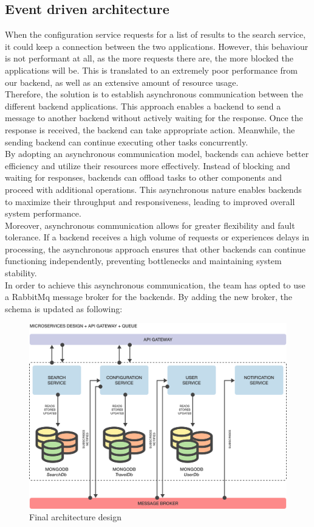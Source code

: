 \documentclass[./chapters/design.tex]{subfiles}
\begin{document}
\subsection{Event driven architecture}
When the configuration service requests for a list of results to the search
service, it could keep a connection between the two applications. However, this
behaviour is not performant at all, as the more requests there are, the more
blocked the applications will be. This is translated to an extremely poor
performance from our backend, as well as an extensive amount of resource usage.
\\
Therefore, the solution is to establish asynchronous communication between the
different backend applications. This approach enables a backend to send a
message to another backend without actively waiting for the response. Once the
response is received, the backend can take appropriate action. Meanwhile, the
sending backend can continue executing other tasks concurrently.
\\
By adopting an asynchronous communication model, backends can achieve better
efficiency and utilize their resources more effectively. Instead of blocking and
waiting for responses, backends can offload tasks to other components and
proceed with additional operations. This asynchronous nature enables backends to
maximize their throughput and responsiveness, leading to improved overall system
performance.
\\
Moreover, asynchronous communication allows for greater flexibility and fault
tolerance. If a backend receives a high volume of requests or experiences delays
in processing, the asynchronous approach ensures that other backends can
continue functioning independently, preventing bottlenecks and maintaining
system stability.
\\[8pt]
In order to achieve this asynchronous communication, the team has opted to use a
RabbitMq message broker for the backends. By adding the new broker, the schema
is updated as following:
\begin{figure}[H]
	\centering
	\includegraphics[width=\textwidth]{./assets/microservice-gateway-queue-struct.png}
	\caption{Final architecture design}
\end{figure}
\end{document}
